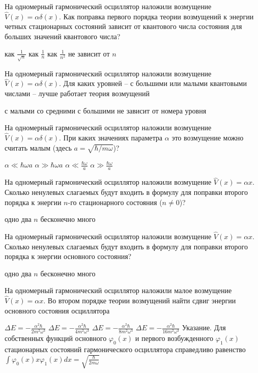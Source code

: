 \documentclass[11pt,a4paper]{exam}
\begin{document}
\begin{questions}
\question На одномерный гармонический осциллятор наложили возмущение $\hat V(x) = \alpha \delta (x)$. Как поправка первого порядка теории возмущений к энергии четных стационарных состояний зависит от квантового числа состояния для больших значений квантового числа?
\begin{choices}
\choice как $\frac{1}{{\sqrt n }}$    
\choice как $\frac{1}{n}$    
\choice как $\frac{1}{{{n^2}}}$    
\choice не зависит от $n$
\end{choices}

\question На одномерный гармонический осциллятор наложили возмущение $\hat V(x) = \alpha \delta (x)$. Для каких уровней – с большими или малыми квантовыми числами – лучше работает теория возмущений
\begin{choices}
\choice с малыми    
\choice со средними 
\choice с большими  
\choice не зависит от номера уровня
\end{choices}

\question На одномерный гармонический осциллятор наложили возмущение $\hat V(x) = \alpha \delta (x)$. При каких значениях параметра $\alpha $ это возмущение можно считать малым (здесь $a = \sqrt {\hbar /m\omega } $)?
\begin{choices}
\choice $\alpha  \ll \hbar \omega a$     
\choice $\alpha  \gg \hbar \omega a$     
\choice $\alpha  \ll \frac{{\hbar \omega }}{a}$      
\choice $\alpha  \gg \frac{{\hbar \omega }}{a}$   
\end{choices}

\question На одномерный гармонический осциллятор наложили возмущение $\hat V(x) = \alpha x$. Сколько ненулевых слагаемых будут входить в формулу для поправки второго порядка к энергии $n$-го стационарного состояния ($n \ne 0$)?
\begin{choices}
\choice одно     
\choice два         
\choice $n$         
\choice бесконечно много
\end{choices}

\question На одномерный гармонический осциллятор наложили возмущение $\hat V(x) = \alpha x$. Сколько ненулевых слагаемых будут входить в формулу для поправки второго порядка к энергии основного состояния?
\begin{choices}
\choice одно     
\choice два         
\choice $n$         
\choice бесконечно много
\end{choices}

\question На одномерный гармонический осциллятор наложили малое возмущение $\hat V(x) = \alpha x$. Во втором порядке теории возмущений найти сдвиг энергии основного состояния осциллятора
\begin{choices}
\choice $\Delta E =  - \frac{{{\alpha ^2}\hbar }}{{2{m^2}{\omega ^3}}}$   
\choice $\Delta E =  - \frac{{{\alpha ^2}\hbar }}{{4{m^2}{\omega ^3}}}$   
\choice $\Delta E =  - \frac{{{\alpha ^2}\hbar }}{{8{m^2}{\omega ^3}}}$   
\choice $\Delta E =  - \frac{{{\alpha ^2}\hbar }}{{16{m^2}{\omega ^3}}}$
Указание. Для собственных функций основного ${\varphi _0}(x)$ и первого возбужденного ${\varphi _1}(x)$ стационарных состояний гармонического осциллятора справедливо равенство $\int {{\varphi _0}(x)x{\varphi _1}(x)dx = } \sqrt {\frac{\hbar }{{2m\omega }}} $
\end{choices}


\end{questions}
\end{document}
